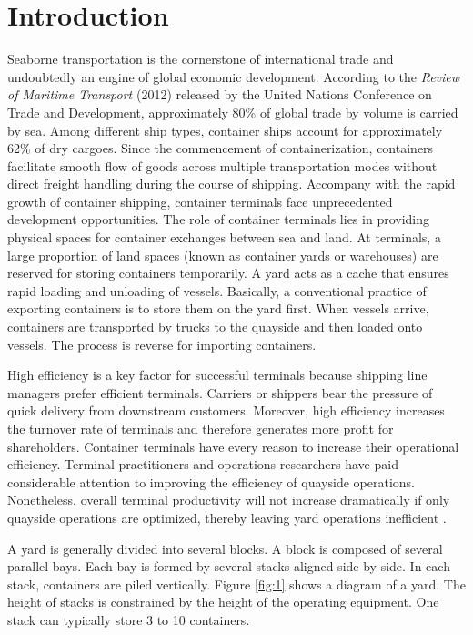 \documentclass[review,3p,times,authoryear,12pt]{elsarticle}
\begin{document}
\section{Introduction}

Seaborne transportation is the cornerstone of international trade and undoubtedly an engine of global economic development.
According to the \textit{Review of Maritime Transport} (2012) released by the United Nations Conference on Trade and Development, approximately 80\% of global trade by volume is carried by sea.
Among different ship types, container ships account for approximately 62\% of dry cargoes.
Since the commencement of containerization, containers facilitate smooth flow of goods across multiple transportation modes without direct freight handling during the course of shipping.
Accompany with the rapid growth of container shipping, container terminals face unprecedented development opportunities.
The role of container terminals lies in providing physical spaces for container exchanges between sea and land.
At terminals, a large proportion of land spaces (known as container yards or warehouses) are reserved for storing containers temporarily.
A yard acts as a cache that ensures rapid loading and unloading of vessels.
Basically, a conventional practice of exporting containers is to store them on the yard first.
When vessels arrive, containers are transported by trucks to the quayside and then loaded onto vessels.
The process is reverse for importing containers.

High efficiency is a key factor for successful terminals because shipping line managers prefer efficient terminals.
Carriers or shippers bear the pressure of quick delivery from downstream customers.
Moreover, high efficiency increases the turnover rate of terminals and therefore generates more profit for shareholders.
Container terminals have every reason to increase their operational efficiency.
Terminal practitioners and operations researchers have paid considerable attention to improving the efficiency of quayside operations.
Nonetheless, overall terminal productivity will not increase dramatically if only quayside operations are optimized, thereby leaving yard operations inefficient \citep{Jiang2012}.

A yard is generally divided into several blocks.
A block is composed of several parallel bays.
Each bay is formed by several stacks aligned side by side.
In each stack, containers are piled vertically.
Figure \ref{fig:1} shows a diagram of a yard.
The height of stacks is constrained by the height of the operating equipment.
One stack can typically store 3 to 10 containers.
\end{document}
